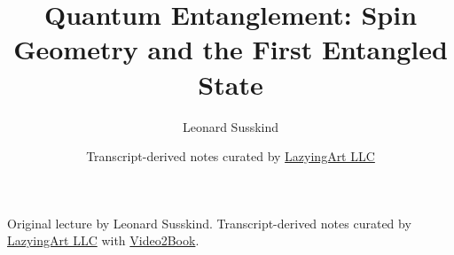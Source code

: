 \documentclass[11pt,oneside]{book}
\begin{document}
\frontmatter
\title{Quantum Entanglement: Spin Geometry and the First Entangled State}
\author{Leonard Susskind}
\date{Transcript-derived notes curated by \href{https://lazying.art}{LazyingArt LLC}}
\maketitle
\begin{center}
\small Original lecture by Leonard Susskind. Transcript-derived notes curated by \href{https://lazying.art}{LazyingArt LLC} with \href{https://github.com/lachlanchen/Video2Book}{Video2Book}.
\end{center}
\clearpage
\mainmatter

\end{document}

